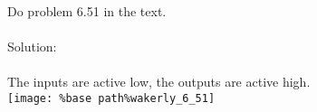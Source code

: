 Do problem 6.51 in the text.\\ \\

Solution: \\ \\
The inputs are active low, the outputs are active high.\\
\texttt{[image: \%base path\%wakerly\_6\_51]}
